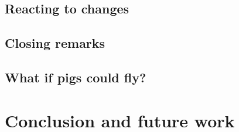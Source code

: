 \documentclass[12pt,a4paper]{article}
\begin{document}
\subsection{Reacting to changes}
\label{sec:results-reacting}

\FloatBarrier
\subsection{Closing remarks}
\label{sec:results-closing-remarks}

\FloatBarrier

\subsection{What if pigs could fly?} %

\section{Conclusion and future work}


%
\end{document}

